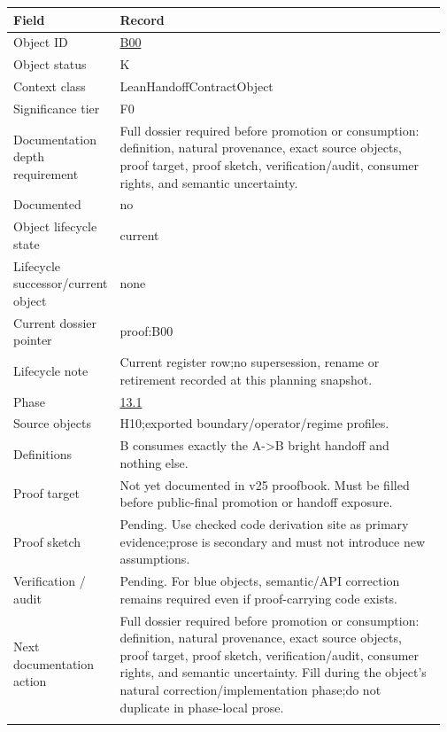\begin{longtable}{L{0.16\linewidth} L{0.81\linewidth}}
\hline
\textbf{Field} & \textbf{Record}\\
\hline
Object ID & \hyperlink{object-row-B00}{B00}\\
\hline\addlinespace[0.20em]
Object status & K\\
\hline\addlinespace[0.20em]
Context class & LeanHandoffContractObject\\
\hline\addlinespace[0.20em]
Significance tier & F0\\
\hline\addlinespace[0.20em]
Documentation depth requirement & Full dossier required before promotion or consumption: definition, natural provenance, exact source objects, proof target, proof sketch, verification/\allowbreak{}audit, consumer rights, and semantic uncertainty.\\
\hline\addlinespace[0.20em]
Documented & no\\
\hline\addlinespace[0.20em]
Object lifecycle state & current\\
\hline\addlinespace[0.20em]
Lifecycle successor/\allowbreak{}current object & none\\
\hline\addlinespace[0.20em]
Current dossier pointer & proof:B00\\
\hline\addlinespace[0.20em]
Lifecycle note & Current register row;\newline no supersession, rename or retirement recorded at this planning snapshot.\\
\hline\addlinespace[0.20em]
Phase & \hyperlink{phase-row-13-1}{13.1}\\
\hline\addlinespace[0.20em]
Source objects & H10;\newline exported boundary/\allowbreak{}operator/\allowbreak{}regime profiles.\\
\hline\addlinespace[0.20em]
Definitions & B consumes exactly the A->B bright handoff and nothing else.\\
\hline\addlinespace[0.20em]
Proof target & Not yet documented in v25 proofbook. Must be filled before public-final promotion or handoff exposure.\\
\hline\addlinespace[0.20em]
Proof sketch & Pending. Use checked code derivation site as primary evidence;\newline prose is secondary and must not introduce new assumptions.\\
\hline\addlinespace[0.20em]
Verification /\allowbreak{} audit & Pending. For blue objects, semantic/\allowbreak{}API correction remains required even if proof-carrying code exists.\\
\hline\addlinespace[0.20em]
Next documentation action & Full dossier required before promotion or consumption: definition, natural provenance, exact source objects, proof target, proof sketch, verification/\allowbreak{}audit, consumer rights, and semantic uncertainty. Fill during the object's natural correction/\allowbreak{}implementation phase;\newline do not duplicate in phase-local prose.\\
\hline\addlinespace[0.20em]
\end{longtable}
